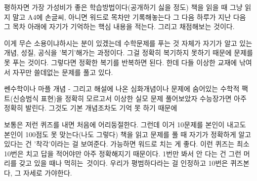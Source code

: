평하자면 가장 가성비가 좋은 학습방법이다(공개하기 싫을 정도)
책을 읽을 때 그냥 읽지 말고 A4에 손글씨, 아니면 워드로 목차만 기록해놓는다
그 다음 하루가 지난 다음 그 목차 아래에 자기가 기억하는 핵심 내용을 적는다. 그리고 채점해보는 것이다.
\vspace{5mm}

이게 무슨 소용이냐하시는 분이 있겠는데 수학문제를 푸는 것 자체가 자기가 알고 있는 개념, 성질, 공식을 '복기'해가는 과정이다.
그걸 정확히 복기하지 못하기 때문에 문제를 못 푸는 것이다.
그렇다면 정확한 복기를 반복하면 된다. 한데 다들 이상한 교재에 낚여서 자꾸만 쓸데없는 문제를 풀고 있다.
\vspace{5mm}

쎈수학이나 마플 개념 - 그리고 해설에 나온 심화개념이나 문제에 숨어있는 수학적 팩트(신승범식 표현)을 정확히 모르고서
이상한 실모 문제 풀어보았자 수능장가면 아주 정확히 발린다. 그것도 기본 개념조차도 기억 못 하기 때문에
\vspace{5mm}

보통은 저런 퀴즈를 내면 처음에 어리둥절한다. 그런데 이거 10문제를 본인이 내고도 본인이 100점도 못 맞는다(나도 그렇다)
책을 읽고 문제를 풀 때 자기가 정확하게 알고 있다는 건 '착각'이라는 걸 보여준다.
가능하면 워드로 치는 게 좋다. 이런 퀴즈는 최소 10번은 치고 답을 적어야만 아주 정확해지기 때문이다.
1번만 봐서 안 다는 건 그런 머리를 갖고 있을 때나 먹히는 것이다.
우리가 평범하다라는 걸 인정하고 10번은 퀴즈본다, 그 자세로 가야한다.
\vspace{5mm}





